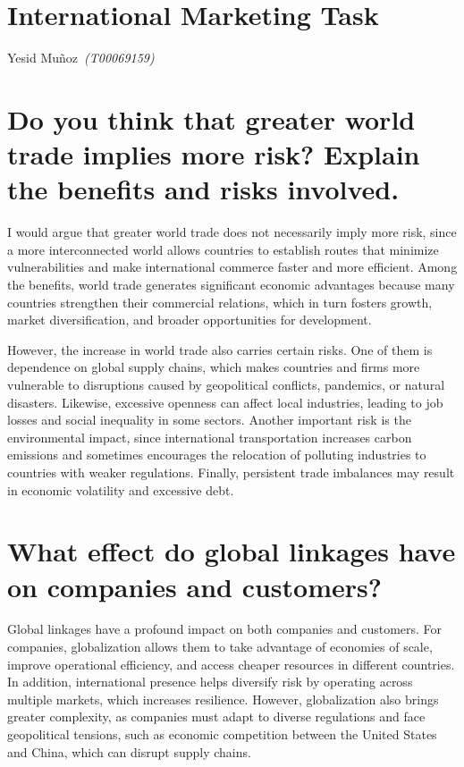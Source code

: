 \documentclass[letterpaper, 12pt]{article}
\begin{document}
\nocite{*}

\section*{International Marketing Task}

Yesid Muñoz~\textit{(T00069159)}

\noindent\makebox[\linewidth]{\rule{\textwidth}{0.4pt}}

\bigskip

\section{Do you think that greater world trade implies more risk? Explain the benefits and risks involved.}

I would argue that greater world trade does not necessarily imply more risk,
since a more interconnected world allows countries to establish routes that
minimize vulnerabilities and make international commerce faster and more
efficient. Among the benefits, world trade generates significant economic
advantages because many countries strengthen their commercial relations, which
in turn fosters growth, market diversification, and broader opportunities for
development.

However, the increase in world trade also carries certain risks. One of them is
dependence on global supply chains, which makes countries and firms more
vulnerable to disruptions caused by geopolitical conflicts, pandemics, or
natural disasters. Likewise, excessive openness can affect local industries,
leading to job losses and social inequality in some sectors. Another important
risk is the environmental impact, since international transportation increases
carbon emissions and sometimes encourages the relocation of polluting
industries to countries with weaker regulations. Finally, persistent trade
imbalances may result in economic volatility and excessive debt.

\section{What effect do global linkages have on companies and customers?}

Global linkages have a profound impact on both companies and customers. For
companies, globalization allows them to take advantage of economies of scale,
improve operational efficiency, and access cheaper resources in different
countries. In addition, international presence helps diversify risk by
operating across multiple markets, which increases resilience. However,
globalization also brings greater complexity, as companies must adapt to
diverse regulations and face geopolitical tensions, such as economic
competition between the United States and China, which can disrupt supply
chains.
\end{document}
